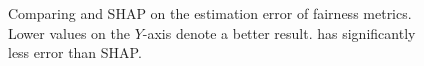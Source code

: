 \begin{figure}[!t]
	\begin{minipage}{0.49\textwidth}
		\centering
	\end{minipage}
	\begin{minipage}{0.5\textwidth}
		\centering
	\end{minipage}
	\caption{Comparing {\fairXplainer} and SHAP on the estimation error of fairness metrics. Lower values on the $ Y $-axis denote a better result. {\fairXplainer} has significantly less error than SHAP.}\label{fig:estimation_error}
\end{figure}
